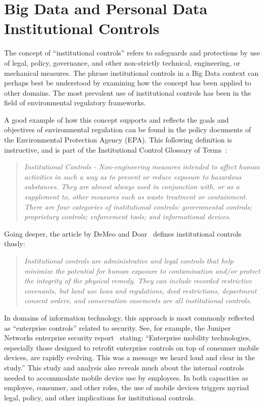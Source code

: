 \section{Big Data and Personal Data Institutional Controls}

The concept of ``institutional controls'' refers to safeguards and protections by use of legal, policy, governance, and other non-strictly technical, engineering, or mechanical measures.
The phrase institutional controls in a Big Data context can perhaps best be understood by examining how the concept has been applied to other domains.
The most prevalent use of institutional controls has been in the field of environmental regulatory frameworks.

A good example of how this concept supports and reflects the goals and objectives of environmental regulation can be found in the policy documents of the Environmental Protection Agency (EPA).
This following definition is instructive, and is part of the Institutional Control Glossary of Terms~\cite{EPA2007}:
\begin{quote}
\emph{
Institutional Controls - Non-engineering measures intended to affect human activities in such a way as to prevent or reduce exposure to hazardous substances. They are almost always used in conjunction with, or as a supplement to, other measures such as waste treatment or containment. There are four categories of institutional controls: governmental controls; proprietary controls; enforcement tools; and informational devices.
}
\end{quote}

Going deeper, the article by DeMeo and Doar~\cite{DeMeo2011} defines institutional controls thusly:
\begin{quote}
\emph{
Institutional controls are administrative and legal controls that help minimize the potential for human exposure to contamination and/or protect the integrity of the physical remedy. They can include recorded restrictive covenants, but land use laws and regulations, deed restrictions, department consent orders, and conservation easements are all institutional controls.
}
\end{quote}

In domains of information technology, this approach is most commonly reflected as ``enterprise controls'' related to security.
See, for example, the Juniper Networks enterprise security report~\cite{Juniper2012} stating: ``Enterprise mobility technologies, especially those designed to retrofit enterprise controls on top of consumer mobile devices, are rapidly evolving. This was a message we heard loud and clear in the study.''
This study and analysis also reveals much about the internal controls needed to accommodate mobile device use by employees.
In both capacities as employee, consumer, and other roles, the use of mobile devices triggers myriad legal, policy, and other implications for institutional controls.

